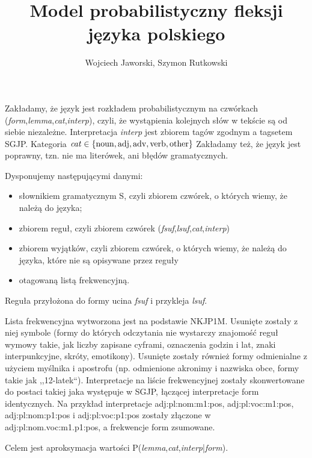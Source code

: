 \documentclass{article}
\title{Model probabilistyczny fleksji języka polskiego}
\author{Wojciech Jaworski, Szymon Rutkowski}
\date{}
\newcommand{\form}{{\it form}}
\newcommand{\lemma}{{\it lemma}}
\newcommand{\cat}{{\it cat}}
\newcommand{\interp}{{\it interp}}
\newcommand{\fsuf}{{\it fsuf}}
\newcommand{\lsuf}{{\it lsuf}}
\begin{document}
\maketitle

Zakładamy, że język jest rozkładem probabilistycznym na czwórkach (\form,\lemma,\cat,\interp),
czyli, że wystąpienia kolejnych słów w tekście są od siebie niezależne.
Interpretacja \interp{} jest zbiorem tagów zgodnym a tagsetem SGJP.
Kategoria $\cat \in \{ {\rm noun}, {\rm adj}, {\rm adv}, {\rm verb}, {\rm other} \}$
Zakładamy też, że język jest poprawny, tzn. nie ma literówek, ani błędów gramatycznych.

Dysponujemy następującymi danymi: 
\begin{itemize}
\item słownikiem gramatycznym S, czyli zbiorem czwórek, o których wiemy, że należą do języka;
\item zbiorem reguł, czyli zbiorem czwórek (\fsuf,\lsuf,\cat,\interp)
\item zbiorem wyjątków, czyli zbiorem czwórek, o których wiemy, że należą do języka, które nie są opisywane przez reguły
\item otagowaną listą frekwencyjną.
\end{itemize}
Reguła przyłożona do formy ucina \fsuf{} i przykleja \lsuf.

Lista frekwencyjna wytworzona jest na podstawie NKJP1M. Usunięte zostały z niej symbole 
(formy do których odczytania nie wystarczy znajomość reguł wymowy takie, jak liczby zapisane cyframi, oznaczenia godzin i lat,
znaki interpunkcyjne, skróty, emotikony). Usunięte zostały również formy odmienialne z użyciem myślnika i apostrofu 
(np. odmienione akronimy i nazwiska obce, formy takie jak ,,12-latek``). 
Interpretacje na liście frekwencyjnej zostały skonwertowane do postaci takiej jaka występuje w SGJP, 
łączącej interpretacje form identycznych. Na przykład interpretacje adj:pl:nom:m1:pos, adj:pl:voc:m1:pos, adj:pl:nom:p1:pos i adj:pl:voc:p1:pos 
zostały złączone w adj:pl:nom.voc:m1.p1:pos, a frekwencje form zsumowane.

Celem jest aproksymacja wartości P(\lemma,\cat,\interp|\form).


\end{document}
